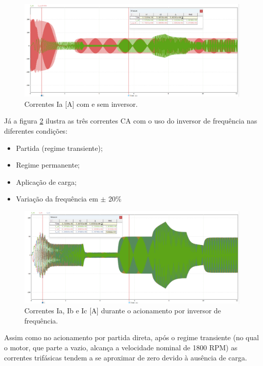 \documentclass[a4paper, 11pt]{article}
\begin{document}
\begin{figure}[H]
    \centering
    \includegraphics[width=1\linewidth]{correcao_images/corre_ia_max.png}
    \caption{Correntes Ia [A] com e sem inversor.}
    \label{fig:corrente-maxim}
\end{figure}

Já a figura \ref{fig:correntes com inversor} ilustra as três correntes CA com o uso do inversor de frequência nas diferentes condições:

\begin{itemize}
    \item Partida (regime transiente);
    \item Regime permanente;
    \item Aplicação de carga;
    \item Variação da frequência em $\pm$ 20\%
\end{itemize}

\begin{figure}[H]
    \centering
    \includegraphics[width=1\linewidth]{correcao_images/todas_is.png}
    \caption{Correntes Ia, Ib e Ic [A] durante o acionamento por inversor de frequência.}
    \label{fig:correntes com inversor}
\end{figure}

Assim como no acionamento por partida direta, após o regime transiente (no qual o motor, que parte a vazio, alcança a velocidade nominal de 1800 RPM) as correntes trifásicas tendem a se aproximar de zero devido à ausência de carga. 
\end{document}
